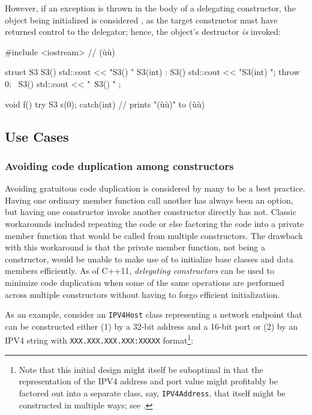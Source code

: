 However, if an exception is thrown in the body of a delegating
constructor, the object being initialized is considered , as the target constructor must have returned control to
the delegator; hence, the object's destructor \emph{is} invoked:

\begin{emcppslisting}[language=C++]
#include <iostream>  // (ù{}ù)

struct S3
{
    S3()           { std::cout << "S3() "              }
    S3(int) : S3() { std::cout << "S3(int) "; throw 0; }
    ~S3()          { std::cout << "~S3() "             }
};

void f() try { S3 s(0); } catch(int) { }
    // prints "(ù{}ù)" to (ù{}ù)
\end{emcppslisting}


\subsection[Use Cases]{Use Cases}\label{ctordelegating-use-cases}

\subsubsection[Avoiding code duplication among constructors]{Avoiding code duplication among constructors}\label{avoiding-code-duplication-among-constructors}

Avoiding gratuitous code duplication is considered by many to be a best
practice. Having one ordinary member function call another has always
been an option, but having one constructor invoke another constructor
directly has not. Classic workarounds included repeating the code or
else factoring the code into a private member function that would be
called from multiple constructors. The drawback with this workaround is
that the private member function, not being a constructor, would be unable to
make use of  to initialize base classes and data members efficiently. As of C++11, \emph{delegating
constructors} can be used to minimize code duplication when some of
the same operations are performed across multiple constructors without
having to forgo efficient initialization.

As an example, consider an \lstinline!IPV4Host! class representing a
network endpoint that can be constructed either (1) by a 32-bit address
and a 16-bit port or (2) by an IPV4 string with
\lstinline!XXX.XXX.XXX.XXX:XXXXX! format{\cprotect\footnote{Note that
this initial design might itself be suboptimal in that the
representation of the IPV4 address and port value might profitably be
factored out into a separate  class, say,
\lstinline!IPV4Address!, that itself might be constructed in multiple ways;
  see .}}:

